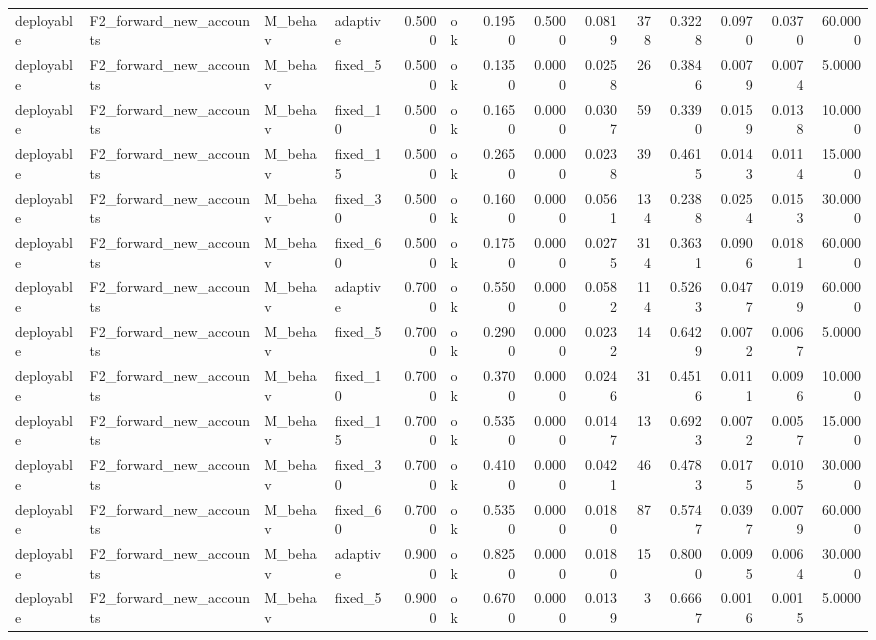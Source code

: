 \begin{table}
\begin{tabular}{llllrlrrrrrrrr}
deployable & F2\_forward\_new\_accounts & M\_behav & adaptive & 0.5000 & ok & 0.1950 & 0.5000 & 0.0819 & 378 & 0.3228 & 0.0970 & 0.0370 & 60.0000 \\
deployable & F2\_forward\_new\_accounts & M\_behav & fixed\_5 & 0.5000 & ok & 0.1350 & 0.0000 & 0.0258 & 26 & 0.3846 & 0.0079 & 0.0074 & 5.0000 \\
deployable & F2\_forward\_new\_accounts & M\_behav & fixed\_10 & 0.5000 & ok & 0.1650 & 0.0000 & 0.0307 & 59 & 0.3390 & 0.0159 & 0.0138 & 10.0000 \\
deployable & F2\_forward\_new\_accounts & M\_behav & fixed\_15 & 0.5000 & ok & 0.2650 & 0.0000 & 0.0238 & 39 & 0.4615 & 0.0143 & 0.0114 & 15.0000 \\
deployable & F2\_forward\_new\_accounts & M\_behav & fixed\_30 & 0.5000 & ok & 0.1600 & 0.0000 & 0.0561 & 134 & 0.2388 & 0.0254 & 0.0153 & 30.0000 \\
deployable & F2\_forward\_new\_accounts & M\_behav & fixed\_60 & 0.5000 & ok & 0.1750 & 0.0000 & 0.0275 & 314 & 0.3631 & 0.0906 & 0.0181 & 60.0000 \\
deployable & F2\_forward\_new\_accounts & M\_behav & adaptive & 0.7000 & ok & 0.5500 & 0.0000 & 0.0582 & 114 & 0.5263 & 0.0477 & 0.0199 & 60.0000 \\
deployable & F2\_forward\_new\_accounts & M\_behav & fixed\_5 & 0.7000 & ok & 0.2900 & 0.0000 & 0.0232 & 14 & 0.6429 & 0.0072 & 0.0067 & 5.0000 \\
deployable & F2\_forward\_new\_accounts & M\_behav & fixed\_10 & 0.7000 & ok & 0.3700 & 0.0000 & 0.0246 & 31 & 0.4516 & 0.0111 & 0.0096 & 10.0000 \\
deployable & F2\_forward\_new\_accounts & M\_behav & fixed\_15 & 0.7000 & ok & 0.5350 & 0.0000 & 0.0147 & 13 & 0.6923 & 0.0072 & 0.0057 & 15.0000 \\
deployable & F2\_forward\_new\_accounts & M\_behav & fixed\_30 & 0.7000 & ok & 0.4100 & 0.0000 & 0.0421 & 46 & 0.4783 & 0.0175 & 0.0105 & 30.0000 \\
deployable & F2\_forward\_new\_accounts & M\_behav & fixed\_60 & 0.7000 & ok & 0.5350 & 0.0000 & 0.0180 & 87 & 0.5747 & 0.0397 & 0.0079 & 60.0000 \\
deployable & F2\_forward\_new\_accounts & M\_behav & adaptive & 0.9000 & ok & 0.8250 & 0.0000 & 0.0180 & 15 & 0.8000 & 0.0095 & 0.0064 & 30.0000 \\
deployable & F2\_forward\_new\_accounts & M\_behav & fixed\_5 & 0.9000 & ok & 0.6700 & 0.0000 & 0.0139 & 3 & 0.6667 & 0.0016 & 0.0015 & 5.0000 \\

\end{tabular}
\end{table}
